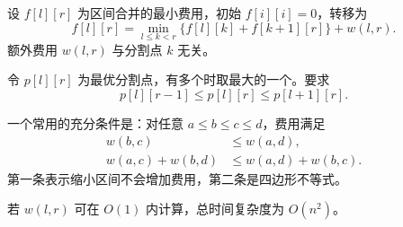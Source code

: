 设 $f[l][r]$ 为区间合并的最小费用，初始 $f[i][i]=0$，转移为
\[
f[l][r]=\min_{l\le k<r}\{f[l][k]+f[k+1][r]\}+w(l,r).
\]
额外费用 $w(l,r)$ 与分割点 $k$ 无关。

令 $p[l][r]$ 为最优分割点，有多个时取最大的一个。要求
\[
p[l][r-1]\le p[l][r]\le p[l+1][r].
\]

一个常用的充分条件是：对任意 $a\le b\le c\le d$，费用满足
\[
\begin{aligned}
w(b,c)&\le w(a,d),\\
w(a,c)+w(b,d)&\le w(a,d)+w(b,c).
\end{aligned}
\]
第一条表示缩小区间不会增加费用，第二条是四边形不等式。

若 $w(l,r)$ 可在 $O(1)$ 内计算，总时间复杂度为 $O(n^2)$。
